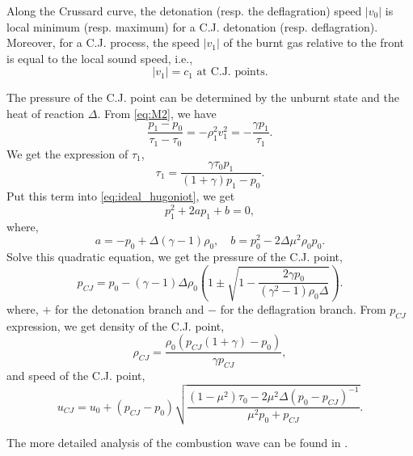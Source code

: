 \begin{lemma}
  Along the Crussard curve, the detonation (resp. the deflagration) speed $|v_0|$ is local minimum (resp. maximum) for a C.J. detonation (resp. deflagration).
  Moreover, for a C.J. process, the speed $|v_1|$ of the burnt gas relative to the front is equal to the local sound speed, i.e.,
  \begin{equation}
    |v_1|=c_1 \text{ at C.J. points}.
  \end{equation}
\end{lemma}
The pressure of the C.J. point can be determined by the unburnt state and the heat of reaction $\Delta$. From \eqref{eq:M2}, we have
\begin{equation}
  \frac{p_1-p_0}{\tau_1-\tau_0} = -\rho_1^2v_1^2 = -\frac{\gamma p_1}{\tau_1}.
\end{equation}
We get the expression of $\tau_1$,
\begin{equation}
\tau_1 = \frac{\gamma \tau_0 p_1}{(1+\gamma)p_1-p_0}.
\end{equation}
Put this term into \eqref{eq:ideal_hugoniot}, we get
\begin{equation}
p_1^2 + 2ap_1 + b = 0,
\end{equation}
where, 
\[
a = -p_0 + \Delta (\gamma -1 ) \rho_0, \quad b = p_0^2 - 2\Delta \mu^2 \rho_0 p_0.
\]
Solve this quadratic equation, we get the pressure of the C.J. point,
\begin{equation}
  p_{CJ} = p_0 - (\gamma -1) \Delta \rho_0
  \left(1\pm \sqrt{1- \frac{2\gamma p_0}{(\gamma^2-1)\rho_0 \Delta}}\right).
\end{equation}
where, $+$ for the detonation branch and $-$ for the deflagration branch.
From $p_{CJ}$ expression, we get density of the C.J. point,
\begin{equation}
\rho_{CJ} = \frac{\rho_0\left(p_{CJ}(1+\gamma)-p_0 \right)}{\gamma p_{CJ}},
\end{equation}
and speed of the C.J. point,
\begin{equation}
 u_{CJ} = u_0 + (p_{CJ}-p_0)\sqrt{\frac{(1-\mu^2)\tau_0-2\mu^2 \Delta (p_0-p_{CJ})^{-1}}{\mu^2p_0+p_{CJ}}}.
\end{equation}

The more detailed analysis of the combustion wave can be found in \cite{tengRiemannProblemsReacting1982,godlewskiNumericalApproximationHyperbolic1996}.


